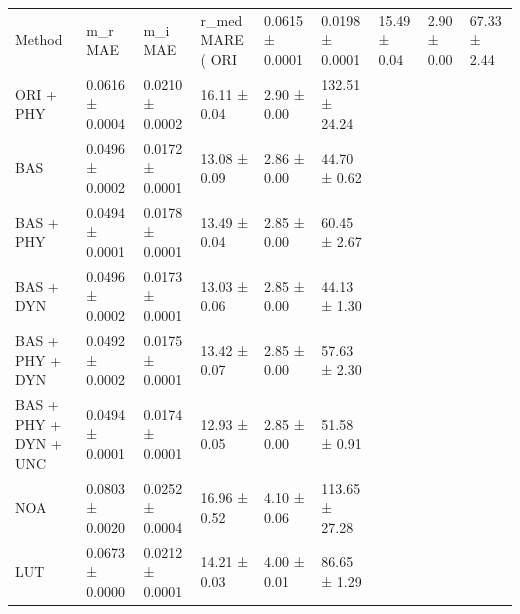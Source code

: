 \begin{tabular}{llllll}
\toprule
Method & m_r MAE & m_i MAE & r_med MARE (%
\midrule
ORI & 0.0615 ± 0.0001 & 0.0198 ± 0.0001 & 15.49 ± 0.04 & 2.90 ± 0.00 & 67.33 ± 2.44 \\
ORI + PHY & 0.0616 ± 0.0004 & 0.0210 ± 0.0002 & 16.11 ± 0.04 & 2.90 ± 0.00 & 132.51 ± 24.24 \\
BAS & 0.0496 ± 0.0002 & 0.0172 ± 0.0001 & 13.08 ± 0.09 & 2.86 ± 0.00 & 44.70 ± 0.62 \\
BAS + PHY & 0.0494 ± 0.0001 & 0.0178 ± 0.0001 & 13.49 ± 0.04 & 2.85 ± 0.00 & 60.45 ± 2.67 \\
BAS + DYN & 0.0496 ± 0.0002 & 0.0173 ± 0.0001 & 13.03 ± 0.06 & 2.85 ± 0.00 & 44.13 ± 1.30 \\
BAS + PHY + DYN & 0.0492 ± 0.0002 & 0.0175 ± 0.0001 & 13.42 ± 0.07 & 2.85 ± 0.00 & 57.63 ± 2.30 \\
BAS + PHY + DYN + UNC & 0.0494 ± 0.0001 & 0.0174 ± 0.0001 & 12.93 ± 0.05 & 2.85 ± 0.00 & 51.58 ± 0.91 \\
NOA & 0.0803 ± 0.0020 & 0.0252 ± 0.0004 & 16.96 ± 0.52 & 4.10 ± 0.06 & 113.65 ± 27.28 \\
LUT & 0.0673 ± 0.0000 & 0.0212 ± 0.0001 & 14.21 ± 0.03 & 4.00 ± 0.01 & 86.65 ± 1.29 \\
\bottomrule
\end{tabular}
